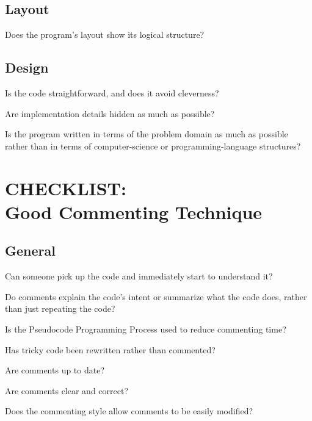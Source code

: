 \begin{multicols}{2}
\subsection*{Layout}
\begin{todolist}
  \item Does the program's layout show its logical structure?
\end{todolist}

\subsection*{Design}
\begin{todolist}
  \item Is the code straightforward, and does it avoid cleverness?
  \item Are implementation details hidden as much as possible?
  \item Is the program written in terms of the problem domain as much as possible rather than in terms of computer-science or programming-language structures?
\end{todolist}

\section*{CHECKLIST:\\Good Commenting Technique}

\subsection*{General}
\begin{todolist}
  \item Can someone pick up the code and immediately start to understand it?
  \item Do comments explain the code's intent or summarize what the code does, rather than just repeating the code?
  \item Is the Pseudocode Programming Process used to reduce commenting time?
  \item Has tricky code been rewritten rather than commented?
  \item Are comments up to date?
  \item Are comments clear and correct?
  \item Does the commenting style allow comments to be easily modified?
\end{todolist}


\end{multicols}
